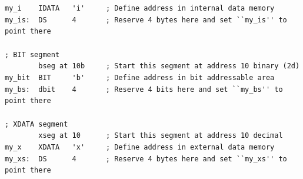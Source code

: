 \documentclass[a4paper,twoside,12pt]{book}
\begin{document}
\begin{code}[h!]
			{\color{highlight_constant}\verb'my_i'}\verb'    '{\color{highlight_directive}\verb'IDATA'}\verb'   '{\color{highlight_char}\verb''\verb"'"\verb'i'\verb"'"\verb''}\verb'     '{\color{highlight_comment}\verb'; Define address in internal data memory'}\\
			{\color{highlight_label}\verb'my_is:'}\verb'  '{\color{highlight_directive}\verb'DS'}\verb'      '{\color{highlight_unknown_base}\verb'4'}\verb'       '{\color{highlight_comment}\verb'; Reserve 4 bytes here and set ``my_is'\verb"'"\verb''\verb"'"\verb' to point there'}\\
			\verb''\\
			{\color{highlight_comment}\verb'; BIT segment'}\\
			\verb'        '{\color{highlight_directive}\verb'bseg'}\verb' '{\color{highlight_constant}\verb'at'}\verb' '{\color{highlight_bin}\verb'10b'}\verb'     '{\color{highlight_comment}\verb'; Start this segment at address 10 binary (2d)'}\\
			{\color{highlight_constant}\verb'my_bit'}\verb'  '{\color{highlight_directive}\verb'BIT'}\verb'     '{\color{highlight_char}\verb''\verb"'"\verb'b'\verb"'"\verb''}\verb'     '{\color{highlight_comment}\verb'; Define address in bit addressable area'}\\
			{\color{highlight_label}\verb'my_bs:'}\verb'  '{\color{highlight_directive}\verb'dbit'}\verb'    '{\color{highlight_unknown_base}\verb'4'}\verb'       '{\color{highlight_comment}\verb'; Reserve 4 bits here and set ``my_bs'\verb"'"\verb''\verb"'"\verb' to point there'}\\
			\verb''\\
			{\color{highlight_comment}\verb'; XDATA segment'}{\color{highlight_constant}\\
			}\verb'        '{\color{highlight_directive}\verb'xseg'}\verb' '{\color{highlight_constant}\verb'at'}\verb' '{\color{highlight_unknown_base}\verb'10'}\verb'      '{\color{highlight_comment}\verb'; Start this segment at address 10 decimal'}\\
			{\color{highlight_constant}\verb'my_x'}\verb'    '{\color{highlight_directive}\verb'XDATA'}\verb'   '{\color{highlight_char}\verb''\verb"'"\verb'x'\verb"'"\verb''}\verb'     '{\color{highlight_comment}\verb'; Define address in external data memory'}\\
			{\color{highlight_label}\verb'my_xs:'}\verb'  '{\color{highlight_directive}\verb'DS'}\verb'      '{\color{highlight_unknown_base}\verb'4'}\verb'       '{\color{highlight_comment}\verb'; Reserve 4 bytes here and set ``my_xs'\verb"'"\verb''\verb"'"\verb' to point there'}\\

\end{code}
\end{document}
